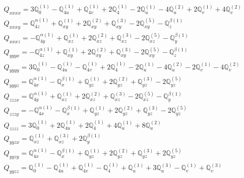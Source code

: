 \documentclass[fleqn,8pt,landscape]{jsarticle}
\begin{document}
\begin{align*}
& Q_{xxxx} = 3 \mathbb{Q}_{0}^{(1)} - \mathbb{Q}_{4u}^{(1)} + \mathbb{Q}_{4v}^{(1)} + 2 \mathbb{Q}_{4}^{(1)} - 2 \mathbb{Q}_{u}^{(1)} - 4 \mathbb{Q}_{u}^{(2)} + 2 \mathbb{Q}_{v}^{(1)} + 4 \mathbb{Q}_{v}^{(2)} \\
& Q_{xxxy} = \mathbb{Q}_{4z}^{\alpha(1)} + \mathbb{Q}_{xy}^{(1)} + 2 \mathbb{Q}_{xy}^{(2)} + \mathbb{Q}_{xy}^{(3)} - 2 \mathbb{Q}_{xy}^{(5)} - \mathbb{Q}_{z}^{\beta(1)} \\
& Q_{xxxz} = - \mathbb{Q}_{4y}^{\alpha(1)} + \mathbb{Q}_{xz}^{(1)} + 2 \mathbb{Q}_{xz}^{(2)} + \mathbb{Q}_{xz}^{(3)} - 2 \mathbb{Q}_{xz}^{(5)} - \mathbb{Q}_{y}^{\beta(1)} \\
& Q_{yyyx} = - \mathbb{Q}_{4z}^{\alpha(1)} + \mathbb{Q}_{xy}^{(1)} + 2 \mathbb{Q}_{xy}^{(2)} + \mathbb{Q}_{xy}^{(3)} - 2 \mathbb{Q}_{xy}^{(5)} - \mathbb{Q}_{z}^{\beta(1)} \\
& Q_{yyyy} = 3 \mathbb{Q}_{0}^{(1)} - \mathbb{Q}_{4u}^{(1)} - \mathbb{Q}_{4v}^{(1)} + 2 \mathbb{Q}_{4}^{(1)} - 2 \mathbb{Q}_{u}^{(1)} - 4 \mathbb{Q}_{u}^{(2)} - 2 \mathbb{Q}_{v}^{(1)} - 4 \mathbb{Q}_{v}^{(2)} \\
& Q_{yyyz} = \mathbb{Q}_{4x}^{\alpha(1)} - \mathbb{Q}_{x}^{\beta(1)} + \mathbb{Q}_{yz}^{(1)} + 2 \mathbb{Q}_{yz}^{(2)} + \mathbb{Q}_{yz}^{(3)} - 2 \mathbb{Q}_{yz}^{(5)} \\
& Q_{zzzx} = \mathbb{Q}_{4y}^{\alpha(1)} + \mathbb{Q}_{xz}^{(1)} + 2 \mathbb{Q}_{xz}^{(2)} + \mathbb{Q}_{xz}^{(3)} - 2 \mathbb{Q}_{xz}^{(5)} - \mathbb{Q}_{y}^{\beta(1)} \\
& Q_{zzzy} = - \mathbb{Q}_{4x}^{\alpha(1)} - \mathbb{Q}_{x}^{\beta(1)} + \mathbb{Q}_{yz}^{(1)} + 2 \mathbb{Q}_{yz}^{(2)} + \mathbb{Q}_{yz}^{(3)} - 2 \mathbb{Q}_{yz}^{(5)} \\
& Q_{zzzz} = 3 \mathbb{Q}_{0}^{(1)} + 2 \mathbb{Q}_{4u}^{(1)} + 2 \mathbb{Q}_{4}^{(1)} + 4 \mathbb{Q}_{u}^{(1)} + 8 \mathbb{Q}_{u}^{(2)} \\
& Q_{yyzx} = \mathbb{Q}_{xz}^{(1)} + \mathbb{Q}_{xz}^{(3)} + 2 \mathbb{Q}_{y}^{\beta(1)} \\
& Q_{yyzy} = \mathbb{Q}_{4x}^{\alpha(1)} - \mathbb{Q}_{x}^{\beta(1)} + \mathbb{Q}_{yz}^{(1)} + 2 \mathbb{Q}_{yz}^{(2)} + \mathbb{Q}_{yz}^{(3)} + 2 \mathbb{Q}_{yz}^{(5)} \\
& Q_{yyzz} = \mathbb{Q}_{0}^{(1)} - \mathbb{Q}_{4u}^{(1)} + \mathbb{Q}_{4v}^{(1)} - \mathbb{Q}_{4}^{(1)} + \mathbb{Q}_{u}^{(1)} + 3 \mathbb{Q}_{u}^{(3)} - \mathbb{Q}_{v}^{(1)} + \mathbb{Q}_{v}^{(3)} \\

\end{align*}
\end{document}
